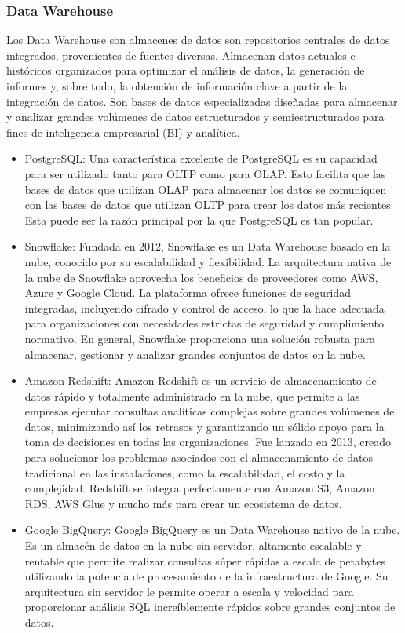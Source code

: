 \documentclass[12pt]{book}
\begin{document}
\subsubsection{Data Warehouse} %
Los Data Warehouse son almacenes de datos son repositorios centrales de datos integrados, provenientes de fuentes diversas. Almacenan datos actuales e históricos organizados para optimizar el análisis de datos, la generación de informes y, sobre todo, la obtención de información clave a partir de la integración de datos.
Son bases de datos especializadas diseñadas para almacenar y analizar grandes volúmenes de datos estructurados y semiestructurados para fines de inteligencia empresarial (BI) y analítica.
\begin{itemize}
    \item PostgreSQL: Una característica excelente de PostgreSQL es su capacidad para ser utilizado tanto para OLTP como para OLAP. Esto facilita que las bases de datos que utilizan OLAP para almacenar los datos se comuniquen con las bases de datos que utilizan OLTP para crear los datos más recientes. Esta puede ser la razón principal por la que PostgreSQL es tan popular.
    \item Snowflake: Fundada en 2012, Snowflake es un Data Warehouse basado en la nube, conocido por su escalabilidad y flexibilidad. La arquitectura nativa de la nube de Snowflake aprovecha los beneficios de proveedores como AWS, Azure y Google Cloud. La plataforma ofrece funciones de seguridad integradas, incluyendo cifrado y control de acceso, lo que la hace adecuada para organizaciones con necesidades estrictas de seguridad y cumplimiento normativo. En general, Snowflake proporciona una solución robusta para almacenar, gestionar y analizar grandes conjuntos de datos en la nube.
    \item Amazon Redshift: Amazon Redshift es un servicio de almacenamiento de datos rápido y totalmente administrado en la nube, que permite a las empresas ejecutar consultas analíticas complejas sobre grandes volúmenes de datos, minimizando así los retrasos y garantizando un sólido apoyo para la toma de decisiones en todas las organizaciones. Fue lanzado en 2013, creado para solucionar los problemas asociados con el almacenamiento de datos tradicional en las instalaciones, como la escalabilidad, el costo y la complejidad. Redshift se integra perfectamente con Amazon S3, Amazon RDS, AWS Glue y mucho más para crear un ecosistema de datos.
    \item Google BigQuery: Google BigQuery es un Data Warehouse nativo de la nube. Es un almacén de datos en la nube sin servidor, altamente escalable y rentable que permite realizar consultas súper rápidas a escala de petabytes utilizando la potencia de procesamiento de la infraestructura de Google. Su arquitectura sin servidor le permite operar a escala y velocidad para proporcionar análisis SQL increíblemente rápidos sobre grandes conjuntos de datos.
\end{itemize}
\end{document}
